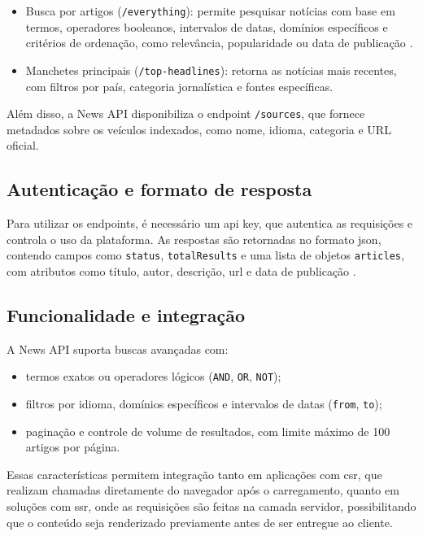 \begin{itemize}
    \item Busca por artigos (\texttt{/everything}): permite pesquisar notícias com base em termos, operadores booleanos, intervalos de datas, domínios específicos e critérios de ordenação, como relevância, popularidade ou data de publicação \cite{newsapi_docs}.
    \item Manchetes principais (\texttt{/top-headlines}): retorna as notícias mais recentes, com filtros por país, categoria jornalística e fontes específicas.
\end{itemize}

Além disso, a News API disponibiliza o endpoint \texttt{/sources}, que fornece metadados sobre os veículos indexados, como nome, idioma, categoria e URL oficial.

\subsection{Autenticação e formato de resposta}
Para utilizar os endpoints, é necessário um \acrshort{api} key, que autentica as requisições e controla o uso da plataforma. As respostas são retornadas no formato \acrshort{json}, contendo campos como \texttt{status}, \texttt{totalResults} e uma lista de objetos \texttt{articles}, com atributos como título, autor, descrição, \acrshort{url} e data de publicação \cite{newsapi_docs}.

\subsection{Funcionalidade e integração}
A News API suporta buscas avançadas com:

\begin{itemize}
    \item termos exatos ou operadores lógicos (\texttt{AND}, \texttt{OR}, \texttt{NOT});
    \item filtros por idioma, domínios específicos e intervalos de datas (\texttt{from}, \texttt{to});
    \item paginação e controle de volume de resultados, com limite máximo de 100 artigos por página.
\end{itemize}

Essas características permitem integração tanto em aplicações com \acrshort{csr}, que realizam chamadas diretamente do navegador após o carregamento, quanto em soluções com \acrshort{ssr}, onde as requisições são feitas na camada servidor, possibilitando que o conteúdo seja renderizado previamente antes de ser entregue ao cliente.






